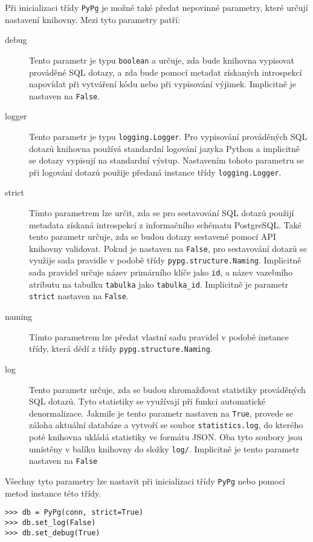 \documentclass[11pt]{article}
\begin{document}
Při inicializaci třídy \lstinline[style=inline]|PyPg| je možné také předat nepovinné parametry, které určují nastavení knihovny. Mezi tyto parametry patří:
\begin{description}
\item[debug] Tento parametr je typu \lstinline[style=inline]|boolean| a určuje, zda bude knihovna vypisovat prováděné SQL dotazy, a zda bude pomocí metadat získaných introspekcí napovídat při vytváření kódu nebo při vypisování výjimek. Implicitně je nastaven na \lstinline[style=inline]|False|.
\item[logger] Tento parametr je typu \lstinline[style=inline]|logging.Logger|. Pro vypisování prováděných SQL dotazů knihovna používá standardní logování jazyka Python a implicitně se dotazy vypisují na standardní výstup. Nastavením tohoto parametru se při logování dotazů použije předaná instance třídy \lstinline[style=inline]|logging.Logger|.
\item[strict] Tímto parametrem lze určit, zda se pro sestavování SQL dotazů použijí metadata získaná introspekcí z informačního schématu PostgreSQL. Také tento parametr určuje, zda se budou dotazy sestavené pomocí API knihovny validovat. Pokud je nastaven na \lstinline[style=inline]|False|, pro sestavování dotazů se využije sada pravidle v podobě třídy \lstinline[style=inline]|pypg.structure.Naming|. Implicitně sada pravidel určuje název primárního klíče jako \lstinline[style=inline]|id|, a název vazebního atributu na tabulku \lstinline[style=inline]|tabulka| jako \lstinline[style=inline]|tabulka_id|. Implicitně je parametr \lstinline[style=inline]|strict| nastaven na \lstinline[style=inline]|False|.
\item[naming] Tímto parametrem lze předat vlastní sadu pravidel v podobě instance třídy, která dědí z třídy \lstinline[style=inline]|pypg.structure.Naming|. 
\item[log] Tento parametr určuje, zda se budou shromažďovat statistiky prováděných SQL dotazů. Tyto statistiky se využívají při funkci automatické denormalizace. Jakmile je tento parametr nastaven na \lstinline[style=inline]|True|, provede se záloha aktuální databáze a vytvoří se soubor \lstinline[style=inline]|statistics.log|, do kterého poté knihovna ukládá statistiky ve formátu JSON. Oba tyto soubory jsou umístěny v balíku knihovny do složky \lstinline[style=inline]|log/|. Implicitně je tento parametr nastaven na \lstinline[style=inline]|False|
\end{description}
Všechny tyto parametry lze nastavit při inicializaci třídy \lstinline[style=inline]|PyPg| nebo pomocí metod instance této třídy.
\begin{lstlisting}[style=python]
>>> db = PyPg(conn, strict=True)
>>> db.set_log(False)
>>> db.set_debug(True)
\end{lstlisting}
\end{document}

